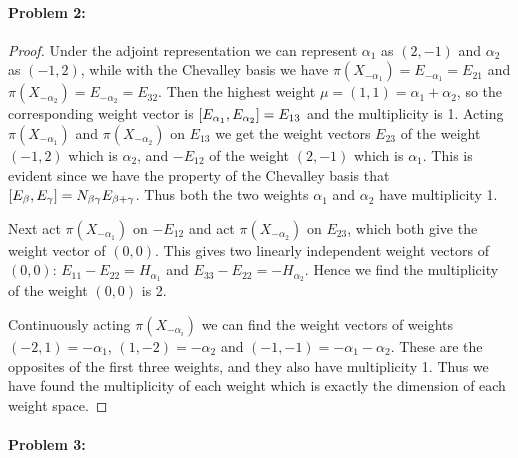 \documentclass[12pt]{article}
\begin{document}
\paragraph{Problem 2:}
\begin{proof}
  Under the adjoint representation we can represent $\alpha_1$ as $(2, -1)$ and $\alpha_2$ as $(-1, 2)$, while with the Chevalley basis we have $\pi(X_{-\alpha_1}) = E_{-\alpha_1} = E_{21}$ and $\pi(X_{-\alpha_2}) = E_{-\alpha_2} = E_{32}$.
  Then the highest weight $\mu = (1, 1) = \alpha_1 + \alpha_2$, so the corresponding weight vector is $\comm{E_{\alpha_1}}{E_{\alpha_2}} = E_{13}$ and the multiplicity is 1.
  Acting $\pi(X_{-\alpha_1})$ and $\pi(X_{-\alpha_2})$ on $E_{13}$ we get the weight vectors $E_{23}$ of the weight $(-1, 2)$ which is $\alpha_2$, and $-E_{12}$ of the weight $(2, -1)$ which is $\alpha_1$.
  This is evident since we have the property of the Chevalley basis that $\comm{E_{\beta}}{E_{\gamma}} = N_{\beta \gamma} E_{\beta + \gamma}$.
  Thus both the two weights $\alpha_1$ and $\alpha_2$ have multiplicity 1.

  Next act $\pi(X_{-\alpha_1})$ on $-E_{12}$ and act $\pi(X_{-\alpha_2})$ on $E_{23}$, which both give the weight vector of $(0, 0)$.
  This gives two linearly independent weight vectors of $(0, 0)$: $E_{11} - E_{22} = H_{\alpha_1}$ and $E_{33} - E_{22} = -H_{\alpha_2}$.
  Hence we find the multiplicity of the weight $(0, 0)$ is 2.

  Continuously acting $\pi(X_{-\alpha_i})$ we can find the weight vectors of weights $(-2, 1) = -\alpha_1$, $(1, -2) = -\alpha_2$ and $(-1, -1) = -\alpha_1 - \alpha_2$.
  These are the opposites of the first three weights, and they also have multiplicity 1.
  Thus we have found the multiplicity of each weight which is exactly the dimension of each weight space.
\end{proof}

\paragraph{Problem 3:}
\end{document}
